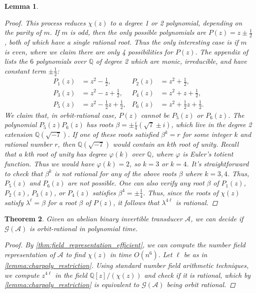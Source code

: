 \documentclass[12pt, letterpaper]{article}
\newcommand{\Q}{\mathbb Q}
\newcommand{\A}{\mathcal A}
\newcommand{\gp}{\mathcal G}
\newtheorem{thm}{Theorem}[section]
\newtheorem{lemma}[thm]{Lemma}
\begin{document}
\begin{lemma}
\begin{proof}
        This process reduces $\chi(z)$ to a degree 1 or 2 polynomial, depending
        on the parity of $m$. If $m$ is odd, then the only possible polynomials
        are $P(z) = z \pm \frac{1}{2}$, both of which have a single rational
        root.  Thus the only interesting case is if $m$ is even, where we claim
        there are only 4 possibilities for $P(z)$. The appendix of
        \cite{Okano-Thesis} lists the $6$ polynomials over $\Q$ of degree 2
        which are monic, irreducible, and have constant term $\pm \frac{1}{2}$:
        \begin{align*}
            P_1(z) &= z^2 - \frac{1}{2}, &
            P_2(z) &= z^2 + \frac{1}{2},\\
            P_3(z) &= z^2 - z + \frac{1}{2}, &
            P_4(z) &= z^2 + z + \frac{1}{2},\\
            P_5(z) &= z^2 - \frac{1}{2} z + \frac{1}{2}, &
            P_6(z) &= z^2 + \frac{1}{2} z + \frac{1}{2}.
        \end{align*}
        We claim that, in orbit-rational case, $P(z)$ cannot be $P_5(z)$ or
        $P_6(z)$.  The polynomial $P_5(z)P_6(z)$ has roots $\beta = \pm
        \frac{i}{4} (\sqrt{7} \pm i)$, which live in the degree 2 extension
        $\Q(\sqrt{-7})$. If one of these roots satisfied $\beta^k = r$ for some
        integer $k$ and rational number $r$, then $\Q(\sqrt{-7})$ would contain
        an $k$th root of unity. Recall that a $k$th root of unity has degree
        $\varphi(k)$ over $\Q$, where $\varphi$ is Euler's totient function.
        Thus we would have $\varphi(k) = 2$, so $k = 3$ or $k = 4$. It's
        straightforward to check that $\beta^k$ is not rational for any of the
        above roots $\beta$ where $k = 3,4$.  Thus, $P_5(z)$ and $P_6(z)$ are
        not possible. One can also verify any root $\beta$ of $P_1(z)$,
        $P_2(z)$, $P_3(z)$, or $P_4(z)$ satisfies $\beta^4 = \pm \frac{1}{4}$.
        Thus, since the roots of $\chi(z)$ satisfy $\lambda^\ell = \beta$ for a
        root $\beta$ of $P(z)$, it follows that $\lambda^{4\ell}$ is rational.
    \end{proof}
\end{lemma}

\begin{thm}\label{thm:orbit_algorithm}
    Given an abelian binary invertible transducer $\A$, we can decide if
    $\gp(\A)$ is orbit-rational in polynomial time.
    \begin{proof}
        By \cref{thm:field_representation_efficient}, we can compute the
        number field representation of $\A$ to find $\chi(z)$ in time $O(n^6)$.
        Let $\ell$ be as in \cref{lemma:charpoly_restriction}. Using standard
        number field arithmetic techniques, we compute $z^{4 \ell}$ in the
        field $\Q[z] / (\chi(z))$ and check if it is rational, which by
        \cref{lemma:charpoly_restriction} is equivalent to $\gp(\A)$ being
        orbit rational.
    \end{proof}
\end{thm}
\end{document}

